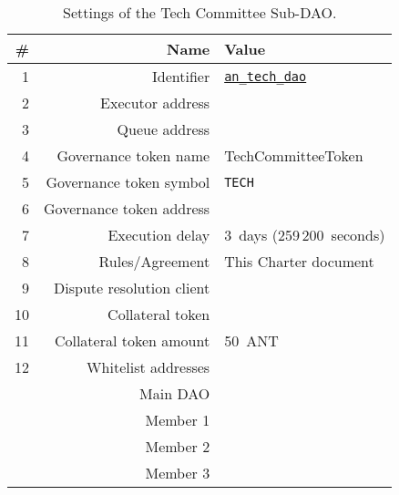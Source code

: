 \begin{table}[h!]
	\caption{Settings of the Tech Committee Sub-DAO.}
	\centering
	\begin{tabular}{rrl}
		\toprule
		\# & Name & Value \\
		\midrule
		 1 & Identifier					& \href{https://govern.aragon.org/\#/daos/an_tech_dao}{\texttt{an\_tech\_dao}}\\
		 2 & Executor address			& \techSubDaoAddr\\
		 3 & Queue address				& \techSubDaoQueueAddr\\
		 4 & Governance token name		& TechCommitteeToken\\
		 5 & Governance token symbol	& \texttt{TECH}\\
		 6 & Governance token address	& \techSubDaoTokenAddr\\
		 7 & Execution delay			& 3~days (259\,200~seconds)\\
		 8 & Rules/Agreement			& This Charter document\\
		 9 & Dispute resolution client	& \aragonCourtAddr\\
		10 & Collateral token			& \antTokenAddr\\
		11 & Collateral token amount	& 50~\ac{ANT}\\
		12 & Whitelist addresses 		& \\
			& Main \ac{DAO} 			& \mainDaoAddr\\
			& Member 1 					& \techSubDaoMemberAddrI\\
			& Member 2 					& \techSubDaoMemberAddrII\\
			& Member 3 					& \techSubDaoMemberAddrIII\\
		\bottomrule
	\end{tabular}
\end{table}




